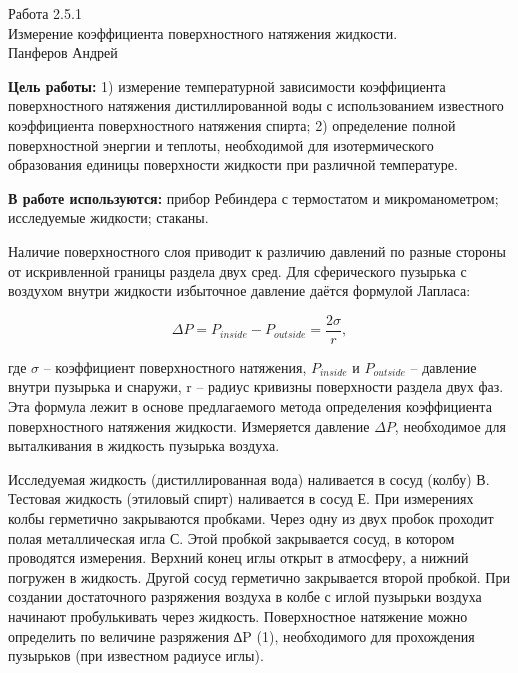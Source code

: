 



\begin{center}
  \LARGE{Работа 2.5.1}\\[0.2cm]
  \LARGE{Измерение коэффициента поверхностного натяжения жидкости.}\\[0.2cm]
  \large{Панферов Андрей}\\[0.2cm]
\end{center}

\textbf{Цель работы:} 1) измерение температурной зависимости  коэффициента поверхностного натяжения дистиллированной воды с использованием известного коэффициента поверхностного натяжения спирта;  2) определение полной поверхностной энергии  и теплоты, необходимой для изотермического образования единицы  поверхности жидкости  при различной температуре. 

\textbf{В работе используются:} прибор  Ребиндера  с термостатом и микроманометром; исследуемые жидкости; стаканы.

\begin{center}
\end{center}

Наличие поверхностного слоя приводит к различию давлений по разные стороны от искривленной границы раздела двух сред.  Для сферического пузырька с воздухом  внутри жидкости избыточное давление даётся формулой Лапласа:

\begin{equation}
\Delta P = P_{inside} - P_{outside} = \frac{2\sigma}{r},
\end{equation}

где $\sigma$ – коэффициент поверхностного натяжения, $P_{inside}$ и $P_{outside}$ – давление внутри пузырька и снаружи, r – радиус кривизны поверхности раздела двух фаз. Эта формула лежит в основе предлагаемого метода определения коэффициента поверхностного натяжения жидкости. Измеряется давление $\Delta P$, необходимое для выталкивания в жидкость пузырька воздуха.

\begin{center}
\end{center}

Исследуемая жидкость (дистиллированная вода) наливается в сосуд (колбу) В. Тестовая жидкость  (этиловый спирт) наливается  в сосуд Е.  При измерениях  колбы герметично закрываются  пробками.   Через одну из двух пробок  проходит полая металлическая игла С. Этой пробкой закрывается сосуд, в котором  проводятся измерения. Верхний конец иглы открыт в атмосферу, а нижний погружен в жидкость. Другой сосуд герметично закрывается второй пробкой. При создании достаточного  разряжения воздуха в колбе с иглой пузырьки воздуха начинают пробулькивать через жидкость. Поверхностное натяжение можно определить по величине разряжения ∆P (1), необходимого для прохождения пузырьков (при известном радиусе иглы).


